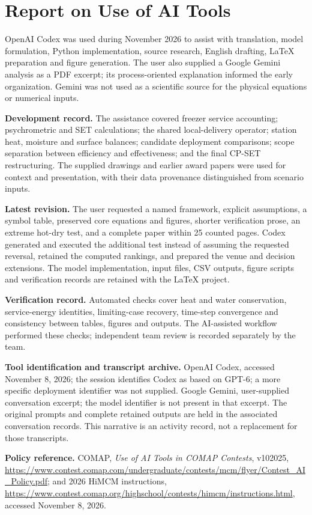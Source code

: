 \section*{Report on Use of AI Tools}
OpenAI Codex was used during November 2026 to assist with translation, model formulation, Python implementation, source research, English drafting, LaTeX preparation and figure generation. The user also supplied a Google Gemini analysis as a PDF excerpt; its process-oriented explanation informed the early organization. Gemini was not used as a scientific source for the physical equations or numerical inputs.

\noindent\textbf{Development record.} The assistance covered freezer service accounting; psychrometric and SET calculations; the shared local-delivery operator; station heat, moisture and surface balances; candidate deployment comparisons; scope separation between efficiency and effectiveness; and the final CP-SET restructuring. The supplied drawings and earlier award papers were used for context and presentation, with their data provenance distinguished from scenario inputs.

\noindent\textbf{Latest revision.} The user requested a named framework, explicit assumptions, a symbol table, preserved core equations and figures, shorter verification prose, an extreme hot-dry test, and a complete paper within 25 counted pages. Codex generated and executed the additional test instead of assuming the requested reversal, retained the computed rankings, and prepared the venue and decision extensions. The model implementation, input files, CSV outputs, figure scripts and verification records are retained with the LaTeX project.

\noindent\textbf{Verification record.} Automated checks cover heat and water conservation, service-energy identities, limiting-case recovery, time-step convergence and consistency between tables, figures and outputs. The AI-assisted workflow performed these checks; independent team review is recorded separately by the team.

\noindent\textbf{Tool identification and transcript archive.} OpenAI Codex, accessed November 8, 2026; the session identifies Codex as based on GPT-6; a more specific deployment identifier was not supplied. Google Gemini, user-supplied conversation excerpt; the model identifier is not present in that excerpt. The original prompts and complete retained outputs are held in the associated conversation records. This narrative is an activity record, not a replacement for those transcripts.

\noindent\textbf{Policy reference.} COMAP, \emph{Use of AI Tools in COMAP Contests}, v102025, \url{https://www.contest.comap.com/undergraduate/contests/mcm/flyer/Contest_AI_Policy.pdf}; and 2026 HiMCM instructions, \url{https://www.contest.comap.org/highschool/contests/himcm/instructions.html}, accessed November 8, 2026.
